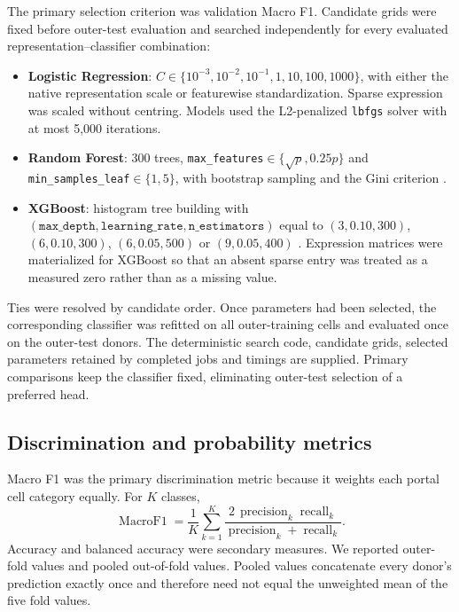 The primary selection criterion was validation Macro F1. Candidate grids were fixed before outer-test evaluation and searched independently for every evaluated representation--classifier combination:

\begin{itemize}
\item \textbf{Logistic Regression}: $C\in\{10^{-3},10^{-2},10^{-1},1,10,100,1000\}$, with either the native representation scale or featurewise standardization. Sparse expression was scaled without centring. Models used the L2-penalized \texttt{lbfgs} solver with at most 5,000 iterations.
\item \textbf{Random Forest}: 300 trees, \texttt{max\_features}$\in\{\sqrt{p},0.25p\}$ and \texttt{min\_samples\_leaf}$\in\{1,5\}$, with bootstrap sampling and the Gini criterion \citep{Breiman2001}.
\item \textbf{XGBoost}: histogram tree building with $(\texttt{max\_depth},\texttt{learning\_rate},\texttt{n\_estimators})$ equal to $(3,0.10,300)$, $(6,0.10,300)$, $(6,0.05,500)$ or $(9,0.05,400)$ \citep{Chen2016}. Expression matrices were materialized for XGBoost so that an absent sparse entry was treated as a measured zero rather than as a missing value.
\end{itemize}

Ties were resolved by candidate order. Once parameters had been selected, the corresponding classifier was refitted on all outer-training cells and evaluated once on the outer-test donors. The deterministic search code, candidate grids, selected parameters retained by completed jobs and timings are supplied. Primary comparisons keep the classifier fixed, eliminating outer-test selection of a preferred head.

\subsection{Discrimination and probability metrics}

Macro F1 was the primary discrimination metric because it weights each portal cell category equally. For $K$ classes,
\begin{equation}
\operatorname{MacroF1}=\frac{1}{K}\sum_{k=1}^{K}\frac{2\,\operatorname{precision}_{k}\operatorname{recall}_{k}}{\operatorname{precision}_{k}+\operatorname{recall}_{k}}.
\end{equation}
Accuracy and balanced accuracy were secondary measures. We reported outer-fold values and pooled out-of-fold values. Pooled values concatenate every donor's prediction exactly once and therefore need not equal the unweighted mean of the five fold values.


